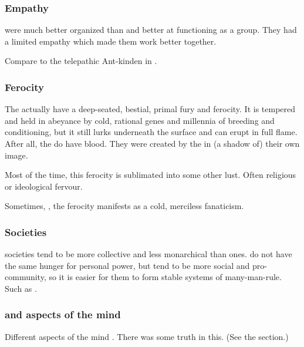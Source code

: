 \subsubsection{Empathy}
\Scathae were much better organized than \humans and better at functioning as a group. 
They had a limited empathy which made them work better together. 

Compare to the telepathic Ant-kinden in \cite{AdrianTchaikovsky:ShadowsoftheApt}. 





\subsubsection{Ferocity}
The \scathae{} actually have a deep-seated, bestial, primal fury and ferocity. 
It is tempered and held in abeyance by cold, rational \ophidian{} genes and millennia of breeding and conditioning, but it still lurks underneath the surface and can erupt in full flame. 
After all, the \scathae{} do have \xsic{} blood. 
They were created by the \dzraicchenosses{} in (a shadow of) their own image. 

Most of the time, this ferocity is sublimated into some other lust. 
Often religious or ideological fervour. 

Sometimes, , the ferocity manifests as a cold, merciless fanaticism. 





\subsubsection{Societies}
\Scathaese{} societies tend to be more collective and less monarchical than \human{} ones. 
\Scathae{} do not have the same hunger for personal power, but tend to be more social and pro-community, so it is easier for them to form stable systems of many-man-rule. 
Such as . 





\subsubsection{\XzaiShanns and aspects of the mind}
Different aspects of the \scathaese mind .
There was some truth in this. 
(See the section.)










